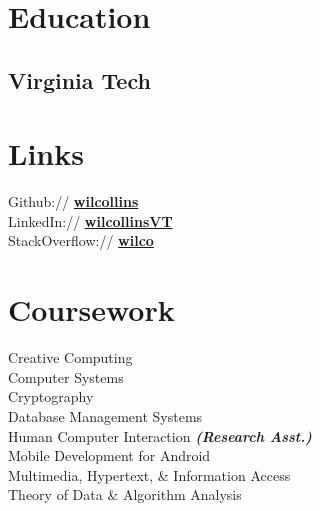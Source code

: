 \documentclass[]{resume}
\begin{document}
%
%
\lastupdated

%
%

%
%

\begin{minipage}[t]{0.35\textwidth} 


\section{Education} 

\subsection{Virginia Tech}

\sectionsep


\section{Links} 
Github:// \href{https://github.com/wilcollins}{\bf{wilcollins}} \\
LinkedIn://  \href{https://www.linkedin.com/in/wilcollinsvt}{\bf{wilcollinsVT}} \\
StackOverflow://  \href{https://stackoverflow.com/users/2104228/wilco}{\bf{wilco}} 
\sectionsep


\section{Coursework}
Creative Computing \\ 
Computer Systems \\
Cryptography \\
Database Management Systems \\
Human Computer Interaction 
{\footnotesize \textit{\textbf{(Research Asst.) }}} \\
Mobile Development for Android \\
Multimedia, Hypertext, \& Information Access \\
Theory of Data \& Algorithm Analysis \\
\sectionsep


\end{minipage}
\end{document}
